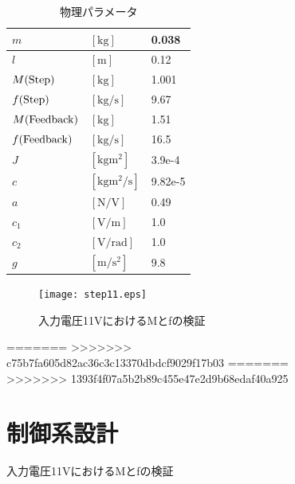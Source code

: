 \documentclass[a4j,11pt,twoside]{ujbook}
\begin{document}
\begin{figure}[htbp]
\begin{center}
\begin{table}[hbtp]
	\begin{center}
		\caption{物理パラメータ}
		\medskip
		\begin{tabular}{|ll|l|} \hline
			$m$ & $[\mathrm{kg}]$ & 0.038 \\ \hline
			$l$ & $[\mathrm{m}]$ & 0.12 \\ \hline
			$M(\rm{Step})$ & $[\mathrm{kg}]$ & 1.001 \\ \hline
			$f(\rm{Step})$ & $[\mathrm{kg/s}]$ & 9.67 \\ \hline
			$M(\rm{Feedback})$ & $[\mathrm{kg}]$ & 1.51 \\ \hline
			$f(\rm{Feedback})$ & $[\mathrm{kg/s}]$ & 16.5 \\ \hline
			$J$ & $[\mathrm{kgm^2}]$ & 3.9e-4 \\ \hline
			$c$ & $[\mathrm{kgm^2/s}]$ & 9.82e-5 \\ \hline
			$a$ & $[\mathrm{N/V}]$ & 0.49 \\ \hline
			$c_1$ & $[\mathrm{V/m}]$ & 1.0 \\ \hline
			$c_2$ & $[\mathrm{V/rad}]$ & 1.0 \\ \hline
			$g$ & $[\mathrm{m/s^2}]$ & 9.8 \\ \hline
		\end{tabular}
	\end{center}
\end{table}

\begin{figure}[htbp]
	\begin{center}
		\texttt{[image: step11.eps]}
		\caption{入力電圧11VにおけるMとfの検証}
		\label{fig:入力電圧11VにおけるMとfの検証}
	\end{center}
\end{figure}

=======
>>>>>>> c75b7fa605d82ac36c3c13370dbdcf9029f17b03
=======
>>>>>>> 1393f4f07a5b2b89c455e47e2d9b68edaf40a925
\chapter{制御系設計}

\end{center}
\end{figure}
\end{document}
